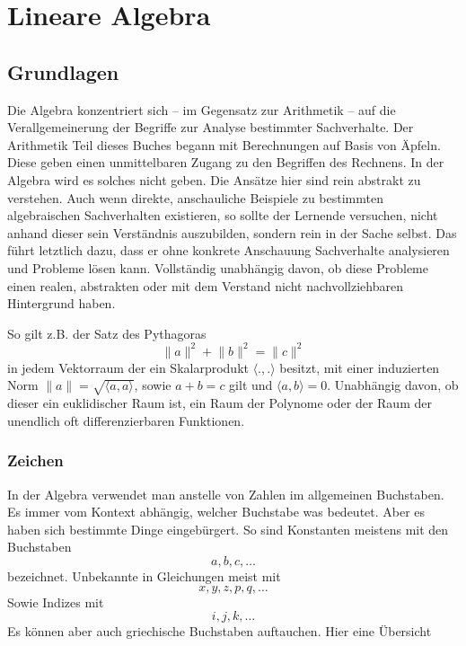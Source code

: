 \part{Lineare Algebra}


\chapter{Grundlagen}

Die Algebra konzentriert sich -- im Gegensatz zur Arithmetik -- auf die Verallgemeinerung der Begriffe zur Analyse bestimmter Sachverhalte. Der Arithmetik Teil dieses Buches begann mit Berechnungen auf Basis von Äpfeln. Diese geben einen unmittelbaren Zugang zu den Begriffen des Rechnens. In der Algebra wird es solches nicht geben. Die Ansätze hier sind rein abstrakt zu verstehen. Auch wenn direkte, anschauliche Beispiele zu bestimmten algebraischen Sachverhalten existieren, so sollte der Lernende versuchen, nicht anhand dieser sein Verständnis auszubilden, sondern rein in der Sache selbst. Das führt letztlich dazu, dass er ohne konkrete Anschauung Sachverhalte analysieren und Probleme lösen kann. Vollständig unabhängig davon, ob diese Probleme einen realen, abstrakten oder mit dem Verstand nicht nachvollziehbaren Hintergrund haben. 

So gilt z.B. der Satz des Pythagoras 
\[\lVert a\rVert ^2 +\lVert b\rVert ^2 = \lVert c\rVert^2\]
in jedem Vektorraum der ein Skalarprodukt $\langle .,.\rangle $ besitzt, mit einer induzierten Norm $\lVert a \rVert = \sqrt{\langle a,a\rangle} $, sowie $a+b=c$ gilt und $\langle a,b\rangle = 0 $. Unabhängig davon, ob dieser ein euklidischer Raum ist, ein Raum der Polynome oder der Raum der unendlich oft differenzierbaren Funktionen.


\section{Zeichen}

In der Algebra verwendet man anstelle von Zahlen im allgemeinen Buchstaben. Es immer vom Kontext abhängig, welcher Buchstabe was bedeutet. Aber es haben sich bestimmte Dinge eingebürgert. So sind Konstanten meistens mit den Buchstaben
\[a, b, c, \dots \]
bezeichnet. Unbekannte in Gleichungen meist mit 
\[x, y, z, p, q, \dots \]
Sowie Indizes mit 
\[i, j, k, \dots \]
Es können aber auch griechische Buchstaben auftauchen. Hier eine Übersicht

\bigskip

